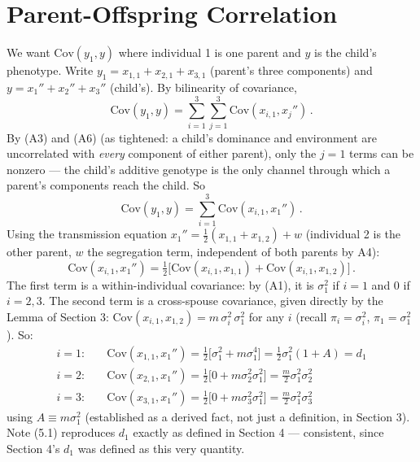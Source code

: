 \documentclass[12pt]{article}
\begin{document}
\section{Parent-Offspring Correlation}

We want $\mathrm{Cov}(y_1,y)$ where individual 1 is one parent and $y$ is the child's phenotype. Write $y_1=x_{1,1}+x_{2,1}+x_{3,1}$ (parent's three components) and $y=x_1''+x_2''+x_3''$ (child's). By bilinearity of covariance,
\begin{equation}
\mathrm{Cov}(y_1,y) = \sum_{i=1}^{3}\sum_{j=1}^{3} \mathrm{Cov}(x_{i,1},x_j'') \, .
\end{equation}
By (A3) and (A6) (as tightened: a child's dominance and environment are uncorrelated with \emph{every} component of either parent), only the $j=1$ terms can be nonzero — the child's additive genotype is the only channel through which a parent's components reach the child. So
\begin{equation}
\mathrm{Cov}(y_1,y) = \sum_{i=1}^{3}\mathrm{Cov}(x_{i,1},x_1'') \, .
\end{equation}
Using the transmission equation $x_1''=\tfrac12(x_{1,1}+x_{1,2})+w$ (individual 2 is the other parent, $w$ the segregation term, independent of both parents by A4):
\begin{equation}
\mathrm{Cov}(x_{i,1},x_1'') = \tfrac12\big[\mathrm{Cov}(x_{i,1},x_{1,1}) + \mathrm{Cov}(x_{i,1},x_{1,2})\big] \, .
\end{equation}
The first term is a within-individual covariance: by (A1), it is $\sigma_1^2$ if $i=1$ and $0$ if $i=2,3$. The second term is a cross-spouse covariance, given directly by the Lemma of Section 3: $\mathrm{Cov}(x_{i,1},x_{1,2}) = m\,\sigma_i^2\,\sigma_1^2$ for any $i$ (recall $\pi_i=\sigma_i^2$, $\pi_1=\sigma_1^2$). So:
\begin{align}
i=1: &\quad \mathrm{Cov}(x_{1,1},x_1'') = \tfrac12\big[\sigma_1^2+m\sigma_1^4\big] = \tfrac12\sigma_1^2(1+A) = d_1 \tag{5.1} \\
i=2: &\quad \mathrm{Cov}(x_{2,1},x_1'') = \tfrac12\big[0+m\sigma_2^2\sigma_1^2\big] = \tfrac{m}{2}\sigma_1^2\sigma_2^2 \tag{5.2} \\
i=3: &\quad \mathrm{Cov}(x_{3,1},x_1'') = \tfrac12\big[0+m\sigma_3^2\sigma_1^2\big] = \tfrac{m}{2}\sigma_1^2\sigma_3^2 \tag{5.3}
\end{align}
using $A\equiv m\sigma_1^2$ (established as a derived fact, not just a definition, in Section 3). Note (5.1) reproduces $d_1$ exactly as defined in Section 4 — consistent, since Section 4's $d_1$ was defined as this very quantity.
\end{document}
